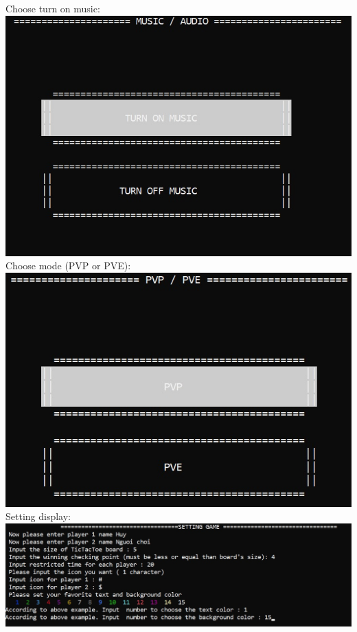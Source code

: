 \documentclass[12pt,a4paper]{article}
\begin{document}
Choose turn on music: \\
\includegraphics[scale=0.7]{picture/Music.jpg}\\
Choose mode (PVP or PVE): \\
\includegraphics[scale=0.7]{picture/PVP_PVE.jpg}\\
Setting display: \\
\includegraphics[scale=0.7]{picture/Setting_Display.jpg}\\ \\ \\ \\
\end{document}

